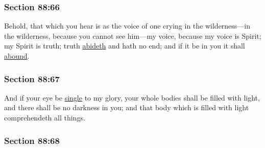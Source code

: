 
	\subsubsection{Section 88:66} %
		\label{DC88-66}

		Behold, that which you hear is as the voice of one crying in the wilderness---in the wilderness, because you cannot see him---my voice, because my voice is Spirit; my Spirit is truth; truth \hyperref[ABIDE]{abideth} and hath no end; and if it be in you it shall \hyperref[ABOUND]{abound}.


	\subsubsection{Section 88:67} %
		\label{DC88-67}

		And if your eye be \hyperref[SINGLE]{single} to my glory, your whole bodies shall be filled with light, and there shall be no darkness in you; and that body which is filled with light comprehendeth all things.


	\subsubsection{Section 88:68} %
		\label{DC88-68}

